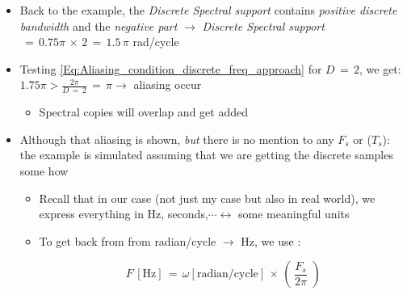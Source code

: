 \begin{itemize}
\begin{itemize}
    \begin{equation}
    \text{Discrete Spectral support} \, < \, \displaystyle\frac{2 \pi}{D}
    \label{Eq:Aliasing_condition_discrete_freq_approach}
    \end{equation}
    
    \begin{itemize}
        \item If this is true, then dowsampling by $D \in \mathbb{N}$ won't cause aliasing
        
        \item If not, then aliasing occur
    \end{itemize}
    
    \item Back to the example, the \textit{Discrete Spectral support} contains \textit{positive discrete bandwidth} and the \textit{negative part} $\rightarrow$ \textit{Discrete Spectral support} $ \, = \, 0.75 \pi \, \times \, 2 \,  = \, 1.5 \, \pi$ rad/cycle
    
    \item Testing \autoref{Eq:Aliasing_condition_discrete_freq_approach} for $D \, = \, 2$, we get: $1.75 \pi > \displaystyle\frac{2 \pi}{D \, = \, 2} \, = \, \pi \rightarrow$ aliasing occur
    
    \begin{itemize}
        \item Spectral copies will overlap and get added
    \end{itemize}
    
    
    \item Although that aliasing is shown, \textit{but} there is no mention to any $F_s$ or ($T_s$): the example is simulated assuming that we are getting the discrete samples some how
    
    \begin{itemize}
        \item Recall that in our case (not just my case but also in real world), we express everything in Hz, seconds,$\cdots \leftrightarrow$ some meaningful units
        
        \item To get back from from radian/cycle $\rightarrow$  Hz, we use \cite{DSP_DimitrisManolakis}:
        
        \begin{equation}
                F \, [\text{Hz}] \, = \, \omega [\text{radian/cycle}] \, \times \, \left( \, \displaystyle\frac{F_s}{2 \pi} \, \, \right)
                \label{Eq:freq_conversion_rad_to_Hz}
        \end{equation}
        

\end{itemize}
\end{itemize}
\end{itemize}
